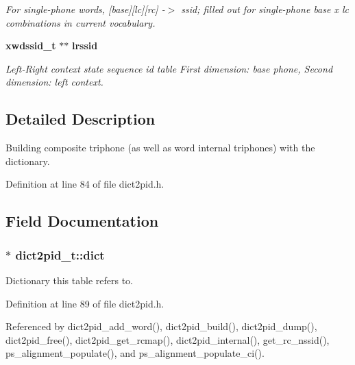 \begin{DoxyCompactItemize}
\begin{DoxyCompactList}\small\item\em For single-\/phone words, [base][lc][rc] -\/$>$ ssid; filled out for single-\/phone base x lc combinations in current vocabulary. \end{DoxyCompactList}\item 
{\bf xwdssid\-\_\-t} $\ast$$\ast$ {\bf lrssid}\label{structdict2pid__t_a6c1de8a269f6ff37dce3dd8cbec4235a}

\begin{DoxyCompactList}\small\item\em Left-\/\-Right context state sequence id table First dimension\-: base phone, Second dimension\-: left context. \end{DoxyCompactList}\end{DoxyCompactItemize}


\subsection{Detailed Description}
Building composite triphone (as well as word internal triphones) with the dictionary. 

Definition at line 84 of file dict2pid.\-h.



\subsection{Field Documentation}
\subsubsection[{dict}]{$\ast$ dict2pid\-\_\-t\-::dict}\label{structdict2pid__t_ae1fecad64884980e9d8355844abc3512}


Dictionary this table refers to. 



Definition at line 89 of file dict2pid.\-h.



Referenced by dict2pid\-\_\-add\-\_\-word(), dict2pid\-\_\-build(), dict2pid\-\_\-dump(), dict2pid\-\_\-free(), dict2pid\-\_\-get\-\_\-rcmap(), dict2pid\-\_\-internal(), get\-\_\-rc\-\_\-nssid(), ps\-\_\-alignment\-\_\-populate(), and ps\-\_\-alignment\-\_\-populate\-\_\-ci().


